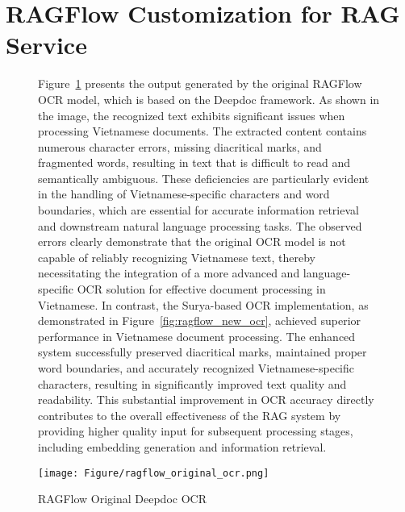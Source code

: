\documentclass[../Main.tex]{subfiles}
\begin{document}
	\section{RAGFlow Customization for RAG Service}
    \label{section:6.1_ragflow_customization_for_rag_service}

	\begin{figure}[h]
		\centering
		\begin{minipage}[t]{0.45\textwidth}
			\vspace{0pt} %
			\small Figure~\ref{fig:ragflow_original_ocr} presents the output generated
			by the original RAGFlow OCR model, which is based on the Deepdoc framework.
			As shown in the image, the recognized text exhibits significant issues when
			processing Vietnamese documents. The extracted content contains numerous
			character errors, missing diacritical marks, and fragmented words, resulting
			in text that is difficult to read and semantically ambiguous. These
			deficiencies are particularly evident in the handling of Vietnamese-specific
			characters and word boundaries, which are essential for accurate information
			retrieval and downstream natural language processing tasks. The observed
			errors clearly demonstrate that the original OCR model is not capable of
			reliably recognizing Vietnamese text, thereby necessitating the integration
			of a more advanced and language-specific OCR solution for effective document
			processing in Vietnamese.
			\vspace{1em}
			In contrast, the Surya-based OCR implementation, as demonstrated in Figure~\ref{fig:ragflow_new_ocr},
			achieved superior performance in Vietnamese document processing. The
			enhanced system successfully preserved diacritical marks, maintained proper
			word boundaries, and accurately recognized Vietnamese-specific characters,
			resulting in significantly improved text quality and readability. This
			substantial improvement in OCR accuracy directly contributes to the
			overall effectiveness of the RAG system by providing higher quality input
			for subsequent processing stages, including embedding generation and information
			retrieval.
		\end{minipage}%
		\hfill
		\begin{minipage}[t]{0.5\textwidth}
			\vspace{0pt} %
			\centering
			\texttt{[image: Figure/ragflow\_original\_ocr.png]}
			\caption{RAGFlow Original Deepdoc OCR}
			\label{fig:ragflow_original_ocr}
		\end{minipage}
	\end{figure}
\end{document}
